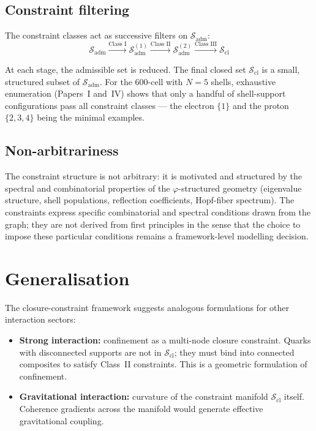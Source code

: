 \documentclass[12pt]{article}
\newcommand{\Sadm}{\mathcal{S}_{\mathrm{adm}}}
\newcommand{\Scl}{\mathcal{S}_{\mathrm{cl}}}
\newcommand{\phig}{\varphi}
\begin{document}
\subsection{Constraint filtering}

The constraint classes act as successive filters on $\Sadm$:
\begin{equation}
    \Sadm \xrightarrow{\text{Class I}} \Sadm^{(1)} \xrightarrow{\text{Class II}} \Sadm^{(2)} \xrightarrow{\text{Class III}} \Scl
\end{equation}

At each stage, the admissible set is reduced. The final closed set $\Scl$ is a small, structured subset of $\Sadm$. For the 600-cell with $N = 5$ shells, exhaustive enumeration (Papers~I and~IV) shows that only a handful of shell-support configurations pass all constraint classes --- the electron $\{1\}$ and the proton $\{2,3,4\}$ being the minimal examples.

\subsection{Non-arbitrariness}

The constraint structure is not arbitrary: it is motivated and structured by the spectral and combinatorial properties of the $\phig$-structured geometry (eigenvalue structure, shell populations, reflection coefficients, Hopf-fiber spectrum). The constraints express specific combinatorial and spectral conditions drawn from the graph; they are not derived from first principles in the sense that the choice to impose these particular conditions remains a framework-level modelling decision.

\section{Generalisation}\label{sec:generalisation}

The closure-constraint framework suggests analogous formulations for other interaction sectors:

\begin{itemize}
    \item \textbf{Strong interaction:} confinement as a multi-node closure constraint. Quarks with disconnected supports are not in $\Scl$; they must bind into connected composites to satisfy Class~II constraints. This is a geometric formulation of confinement.
    \item \textbf{Gravitational interaction:} curvature of the constraint manifold $\Scl$ itself. Coherence gradients across the manifold would generate effective gravitational coupling.
\end{itemize}
\end{document}
